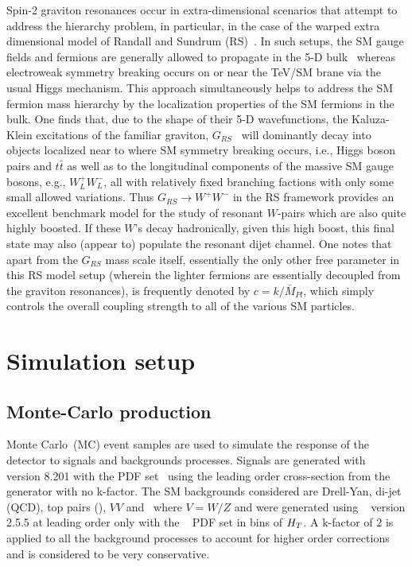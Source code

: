 \documentclass[a4paper,11pt]{article}
\begin{document}
Spin-2 graviton resonances occur in extra-dimensional scenarios that attempt to address the hierarchy problem, in particular, in the case of the warped extra dimensional model of
Randall and Sundrum (RS)~\cite{Randall:1999ee}. In such setups, the SM gauge fields and fermions are generally allowed to propagate in the 5-D
bulk~\cite{Pomarol:1999ad,Davoudiasl:1999tf,Grossman:1999ra,Davoudiasl:2000wi,Gherghetta:2000qt} whereas electroweak symmetry breaking occurs on or near the TeV/SM brane
via the usual Higgs mechanism. This approach simultaneously helps to address the SM fermion mass hierarchy by the localization properties of the SM fermions in the bulk.
One finds that, due to the shape of their 5-D wavefunctions, the Kaluza-Klein excitations of the familiar graviton, $G_{RS}$~\cite{Davoudiasl:1999jd} will dominantly decay into
objects localized near to where SM symmetry breaking occurs, i.e., Higgs boson pairs and $t\bar t$ as well as to the longitudinal components of the massive SM gauge bosons, e.g.,
$W^+_L W^-_L$, all with relatively fixed branching factions with only some small allowed variations. Thus $G_{RS}\rightarrow
W^+W^-$ in the RS framework provides an excellent benchmark model for the study of resonant $W$-pairs which are also quite highly boosted. If these $W$'s decay hadronically,
given this high boost, this final state may also (appear to) populate the resonant dijet channel. One notes that apart from the $G_{RS}$ mass scale itself, essentially the only other
free parameter in this RS model setup (wherein the lighter fermions are essentially decoupled from the graviton resonances), is frequently denoted by $c=k/\bar M_{Pl}$, which simply
controls the overall coupling strength to all of the various SM particles.


\section{Simulation setup}
\label{sec:simulation}

\subsection{Monte-Carlo production}
\label{subsec:mcprod}

Monte Carlo~(MC) event samples are used to simulate the response of the detector to signals and backgrounds processes. Signals are generated with \py~\cite{Sjostrand:2014zea} version 8.201 with the  PDF set~\cite{Ball:2014uwa} using the leading order cross-section from the generator with no k-factor. The SM backgrounds considered are Drell-Yan, di-jet (QCD), top pairs (\ttbar), $VV$ and \vj\ where $V=W/Z$ and were generated using \MGAMC~\cite{Alwall:2014hca} version 2.5.5 at leading order only with the ~\cite{Ball:2014uwa} PDF set in bins of $H_{T}$. A k-factor of 2 is applied to all the background processes to account for higher order corrections and is considered to be very conservative.
\end{document}
